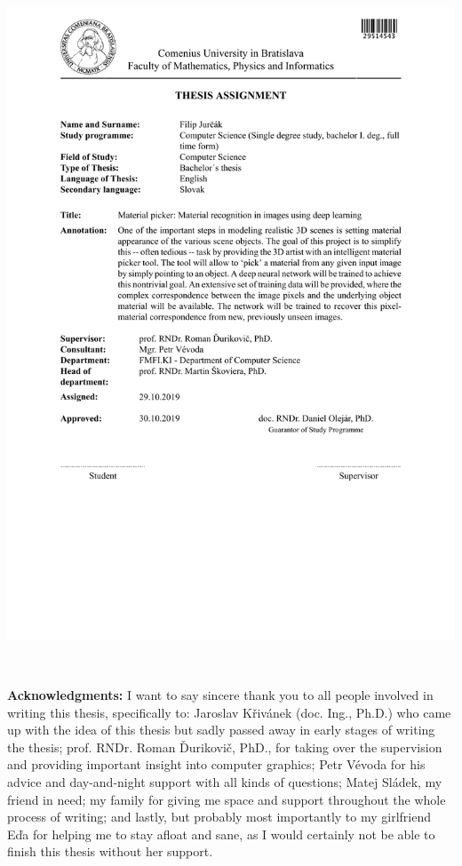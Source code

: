 \documentclass[12pt, twoside]{book}
\begin{document}
\hspace{-2cm}\includegraphics[width=1.1\textwidth]{praca/images/zadanie-jurcak-en.pdf}


\frontmatter

\setcounter{page}{3}
\newpage 
~

\vfill
{\bf Acknowledgments:} I want to say sincere thank you to all people involved in writing this thesis, specifically to: Jaroslav Křivánek (doc. Ing., Ph.D.) who came up with the idea of this thesis but sadly passed away in early stages of writing the thesis; prof. RNDr. Roman Ďurikovič, PhD., for taking over the supervision and providing important insight into computer graphics; Petr Vévoda for his advice and day-and-night support with all kinds of questions; Matej Sládek, my friend in need; my family for giving me space and support throughout the whole process of writing; and lastly, but probably most importantly to my girlfriend Eďa for helping me to stay afloat and sane, as I would certainly not be able to finish this thesis without her support.
\end{document}
